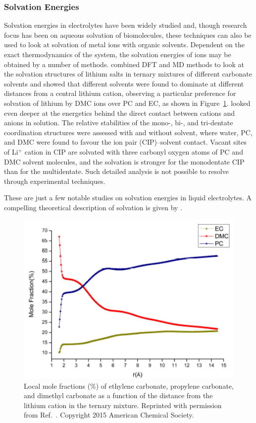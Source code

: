 \documentclass[../main.tex]{subfiles}
\begin{document}
\subsubsection{Solvation Energies}
Solvation energies in electrolytes have been widely studied and, though research focus has been on aqueous solvation of biomolecules, these techniques can also be used to look at solvation of metal ions with organic solvents. Dependent on the exact thermodynamics of the system, the solvation energies of ions may be obtained by a number of methods. \citeauthor{Skarmoutsos_2015} combined DFT and MD methods to look at the solvation structures of lithium salts in ternary mixtures of different carbonate solvents and showed that different solvents were found to dominate at different distances from a central lithium cation, observing a particular preference for solvation of lithium by DMC ions over PC and EC, as shown in Figure~\ref{fig:solvation}. \citeauthor{Takeuchi_2012} looked even deeper at the energetics behind the direct contact between cations and anions in solution.\cite{Takeuchi_2012} The relative stabilities of the mono-, bi-, and tri-dentate coordination structures were assessed with and without solvent, where water, PC, and DMC were found to favour the ion pair (CIP)–solvent contact. Vacant sites of Li$^+$ cation in CIP are solvated with three carbonyl oxygen atoms of PC and DMC solvent molecules, and the solvation is stronger for the monodentate CIP than for the multidentate.\cite{Takeuchi_2012} Such detailed analysis is not possible to resolve through experimental techniques.

These are just a few notable studies on solvation energies in liquid electrolytes. A compelling theoretical description of solvation is given by \citeauthor{Lazaridis_1998}.\cite{Lazaridis_1998}

\begin{figure}
    \centering
    \includegraphics[scale=0.3]{figures/solvents_ternary_mixute_le.jpg}
    \caption{Local mole fractions (\%) of ethylene carbonate, propylene carbonate, and dimethyl carbonate as a function of the distance from the lithium cation in the ternary mixture. Reprinted with permission from Ref.~. Copyright 2015 American Chemical Society.}
    \label{fig:solvation}
\end{figure}
\end{document}
